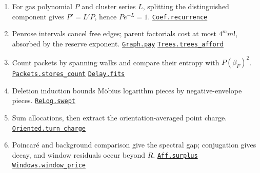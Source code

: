 \documentclass[
  letterpaper,
  11pt]{article}
\providecommand{\tightlist}{%
  \setlength{\itemsep}{0pt}\setlength{\parskip}{0pt}}
\begin{document}
\begin{enumerate}
\def\labelenumi{\arabic{enumi}.}
\tightlist
\item
  For gas polynomial \(P\) and cluster series \(L\), splitting the
  distinguished component gives \(P'=L'P\), hence \(Pe^{-L}=1\).
  \href{https://github.com/yang-mills-group/OpenAI-YM-20261028/blob/3456e5e75cf8d4cd558955a5c7638fba2d68f464/YM/Push/ABSOLUTE_SUMS/Coef.lean\#L129-L138}{\texttt{Coef.recurrence}}
\item
  Penrose intervals cancel free edges; parent factorials cost at most
  \(4^mm!\), absorbed by the reserve exponent.
  \href{https://github.com/yang-mills-group/OpenAI-YM-20261028/blob/3456e5e75cf8d4cd558955a5c7638fba2d68f464/YM/Push/ABSOLUTE_SUMS/Graph.lean\#L113-L148}{\texttt{Graph.pay}}
  \href{https://github.com/yang-mills-group/OpenAI-YM-20261028/blob/3456e5e75cf8d4cd558955a5c7638fba2d68f464/YM/Push/ABSOLUTE_SUMS/Weigh.lean\#L192-L228}{\texttt{Trees.trees\_afford}}
\item
  Count packets by spanning walks and compare their entropy with
  \(P(\beta_F)^2\).
  \href{https://github.com/yang-mills-group/OpenAI-YM-20261028/blob/3456e5e75cf8d4cd558955a5c7638fba2d68f464/YM/Push/ABSOLUTE_SUMS/Packet.lean\#L260-L269}{\texttt{Packets.stores\_count}}
  \href{https://github.com/yang-mills-group/OpenAI-YM-20261028/blob/3456e5e75cf8d4cd558955a5c7638fba2d68f464/YM/Push/ABSOLUTE_SUMS/Delay.lean\#L165-L214}{\texttt{Delay.fits}}
\item
  Deletion induction bounds Möbius logarithm pieces by negative-envelope
  pieces.
  \href{https://github.com/yang-mills-group/OpenAI-YM-20261028/blob/3456e5e75cf8d4cd558955a5c7638fba2d68f464/YM/SectorNext/VACUUM_NORMALIZATION/Deletion.lean\#L224-L233}{\texttt{ReLog.swept}}
\item
  Sum allocations, then extract the orientation-averaged point charge.
  \href{https://github.com/yang-mills-group/OpenAI-YM-20261028/blob/3456e5e75cf8d4cd558955a5c7638fba2d68f464/YM/Push/SECTOR_MEASURE/Oriented.lean\#L267-L297}{\texttt{Oriented.turn\_charge}}
\item
  Poincaré and background comparison give the spectral gap; conjugation
  gives decay, and window residuals occur beyond \(R\).
  \href{https://github.com/yang-mills-group/OpenAI-YM-20261028/blob/3456e5e75cf8d4cd558955a5c7638fba2d68f464/YM/AnalyticNext/CONNECTED_ACTIVITY_BOUNDS/Bedrock.lean\#L72-L113}{\texttt{Aff.surplus}}
  \href{https://github.com/yang-mills-group/OpenAI-YM-20261028/blob/3456e5e75cf8d4cd558955a5c7638fba2d68f464/YM/AnalyticNext/CONNECTED_ACTIVITY_BOUNDS/Windows.lean\#L146-L169}{\texttt{Windows.window\_price}}
\end{enumerate}
\end{document}
